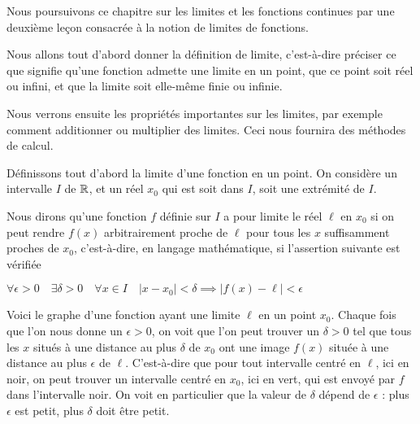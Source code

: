 







\debuttexte


\diapo

\change
Nous poursuivons ce chapitre sur les limites et les fonctions continues par 
une deuxième leçon consacrée à la notion de limites de fonctions.

\change
Nous allons tout d'abord donner la définition de limite, c'est-à-dire préciser ce que signifie qu'une fonction admette une limite en un point, que ce point soit réel ou infini, et que la limite soit elle-même finie ou infinie.

\change
Nous verrons ensuite les propriétés importantes sur les limites, par exemple comment additionner ou multiplier des limites. Ceci nous fournira des méthodes de calcul.


\diapo

Définissons tout d'abord la limite d'une fonction en un point. 
On considère un intervalle $I$ de $\mathbb{R}$, et un réel $x_0$ qui est soit dans 
$I$, soit une extrémité de $I$.

\change
Nous dirons qu'une fonction $f$ définie sur $I$ a pour limite le réel $\ell$ en $x_0$ si on peut rendre $f(x)$ arbitrairement proche de $\ell$ pour tous les $x$ suffisamment proches de $x_0$, c'est-à-dire, en langage mathématique,  si l'assertion suivante est vérifiée

$
\forall \epsilon>0 \quad \exists \delta>0 \quad \forall x\in I \quad \vert x-x_0\vert <\delta 
\implies \vert f(x)-\ell\vert <\epsilon
$

\change
Voici le graphe d'une fonction ayant une limite $\ell$ en un point $x_0$. 
Chaque fois que l'on nous donne un $\epsilon>0$, on voit que l'on peut trouver un $\delta>0$ tel que tous les $x$ situés à une distance au plus $\delta$ de $x_0$ ont une image $f(x)$ située à une distance au plus $\epsilon$ de $\ell$. C'est-à-dire que pour tout intervalle centré en $\ell$, ici en noir, on peut trouver un intervalle centré en $x_0$, ici en vert, qui est envoyé par $f$ dans l'intervalle noir. On voit en particulier que la valeur de $\delta$ dépend de $\epsilon$ : plus $\epsilon$ est petit, plus $\delta$ doit être petit.


